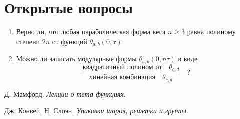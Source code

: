 \documentclass{article}
\theoremstyle{break}
\begin{document}
\section{Открытые вопросы}

\begin{enumerate}
	\item Верно ли, что любая параболическая форма веса $n \ge 3$ равна полиному
	степени $2n$ от функций $\theta_{a, b}(0, \tau)$.
	\item Можно ли записать модулярные формы $\theta_{a, b}(0, n\tau)$ в виде
	\begin{equation}
	\frac{\text{квадратичный полином от} \quad \theta_{c, d}}{\text{линейная комбинация} \quad \theta_{c, d}}
	\quad ?
	\end{equation}
\end{enumerate}

\begin{thebibliography}{999}
	
	Д. Мамфорд.
	\emph{Лекции о тета-функциях}.
	
	Дж. Конвей, Н. Слоэн. 
	\emph{Упаковки шаров, решетки и группы}.
	
\end{thebibliography}
\end{document}
